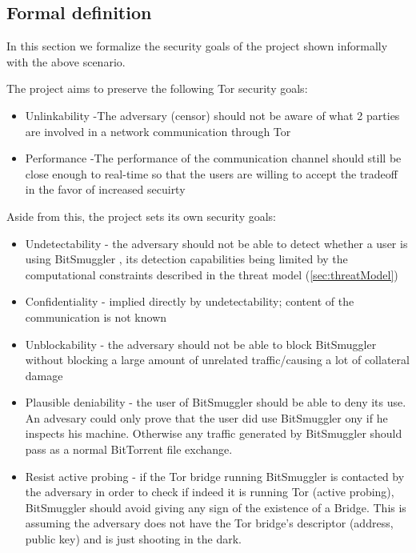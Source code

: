 \documentclass[11pt]{article} %
\newcommand{\projectName}{BitSmuggler }
\begin{document}
\subsection{Formal definition}

In this section we formalize the security goals of the project shown informally with the above scenario.

The project aims to preserve the following Tor security goals:

\begin{itemize}
\item Unlinkability -The adversary (censor) should not be aware of what 2 parties are involved in a network communication through Tor
\item Performance -The performance of the communication channel should still be close enough to real-time so that the users are willing  to accept the tradeoff  in the favor of increased secuirty
\end{itemize}

Aside from this, the project sets its own security goals: 
\begin{itemize}
\item Undetectability - the adversary should not be able to detect whether a user is using \projectName, its detection capabilities being limited by the computational constraints described in the threat model (\ref{sec:threatModel})
\item Confidentiality - implied directly by undetectability; content of the communication is not known
\item Unblockability - the adversary should not be able to block \projectName without blocking a large amount of unrelated traffic/causing a lot of collateral damage
\item Plausible deniability - the user of \projectName should be able to deny its use. An advesary could only prove that the user did use \projectName ony if he inspects his machine. Otherwise any traffic generated by \projectName should pass as a normal BitTorrent file exchange.
\item Resist active probing - if the Tor bridge running \projectName is contacted by the adversary in order to check if indeed it is running Tor (active probing), \projectName should avoid giving any sign of the existence of a Bridge. This is assuming the adversary does not have the Tor bridge's descriptor (address, public key) and is just shooting in the dark.
\end{itemize}
\end{document}
